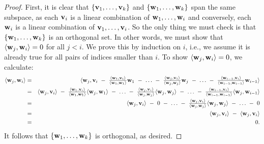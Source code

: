 \begin{proof}
  First, it is clear that $\set{\vect{v}_1,\ldots,\vect{v}_k}$ and
  $\set{\vect{w}_1,\ldots,\vect{w}_k}$ span the same subspace, as each
  $\vect{v}_i$ is a linear combination of
  $\vect{w}_1,\ldots,\vect{w}_i$ and conversely, each $\vect{w}_i$ is
  a linear combination of $\vect{v}_1,\ldots,\vect{v}_i$. So the only
  thing we must check is that $\set{\vect{w}_1,\ldots,\vect{w}_k}$ is
  an orthogonal set. In other words, we must show that
  $\iprod{\vect{w}_j,\vect{w}_i}=0$ for all $j<i$. We prove this by
  induction on $i$, i.e., we assume it is already true for all pairs
  of indices smaller than $i$. To show
  $\iprod{\vect{w}_j,\vect{w}_i}=0$, we calculate:
  \begin{eqnarray*}
    \iprod{\vect{w}_j,\vect{w}_i}
    &=& \textstyle
        \iprod{\vect{w}_j, \vect{v}_i
        ~-~ \frac{\iprod{\vect{w}_1,\vect{v}_i}}{\iprod{\vect{w}_1,\vect{w}_1}}\vect{w}_1
        ~-~ \ldots
        ~-~ \frac{\iprod{\vect{w}_j,\vect{v}_i}}{\iprod{\vect{w}_j,\vect{w}_j}}\vect{w}_j
        ~-~ \ldots
        ~-~ \frac{\iprod{\vect{w}_{i-1},\vect{v}_i}}{\iprod{\vect{w}_{i-1},\vect{w}_{i-1}}}\vect{w}_{i-1}}
    \\
    &=& \textstyle
        \iprod{\vect{w}_j, \vect{v}_i}
        ~-~ \frac{\iprod{\vect{w}_1,\vect{v}_i}}{\iprod{\vect{w}_1,\vect{w}_1}}\iprod{\vect{w}_j,\vect{w}_1}
        ~-~ \ldots
        ~-~ \frac{\iprod{\vect{w}_j,\vect{v}_i}}{\iprod{\vect{w}_j,\vect{w}_j}}\iprod{\vect{w}_j,\vect{w}_j}
        ~-~ \ldots
        ~-~ \frac{\iprod{\vect{w}_{i-1},\vect{v}_i}}{\iprod{\vect{w}_{i-1},\vect{w}_{i-1}}}\iprod{\vect{w}_j,\vect{w}_{i-1}}
    \\
    &=& \textstyle
        \iprod{\vect{w}_j, \vect{v}_i}
        ~-~ 0
        ~-~ \ldots
        ~-~ \frac{\iprod{\vect{w}_j,\vect{v}_i}}{\iprod{\vect{w}_j,\vect{w}_j}}\iprod{\vect{w}_j,\vect{w}_j}
        ~-~ \ldots
        ~-~ 0
    \\
    &=& \iprod{\vect{w}_j, \vect{v}_i}
        ~-~ \iprod{\vect{w}_j,\vect{v}_i}
    \\
    &=& 0.
  \end{eqnarray*}
  It follows that $\set{\vect{w}_1,\ldots,\vect{w}_k}$ is orthogonal,
  as desired.
\end{proof}

